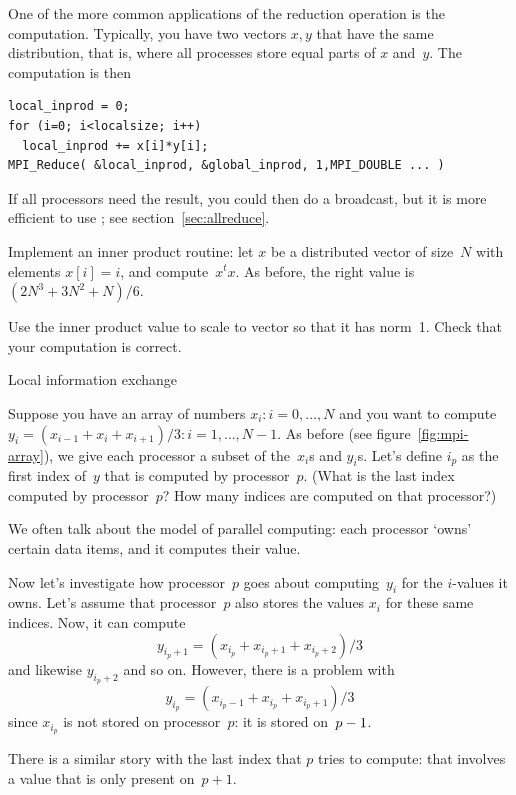 One of the more common applications of the reduction operation
is the  computation. Typically, you have two vectors $x,y$
that have the same distribution, that is,
where all processes store equal parts of $x$ and~$y$.
The computation is then
\begin{verbatim}
local_inprod = 0;
for (i=0; i<localsize; i++)
  local_inprod += x[i]*y[i];
MPI_Reduce( &local_inprod, &global_inprod, 1,MPI_DOUBLE ... ) 
\end{verbatim}
If all processors need the result, you could then do a broadcast,
but it is more efficient to use ; 
see section~\ref{sec:allreduce}.

\begin{exercise}
  \label{ex:inproduct}
  Implement an inner product routine: let $x$ be a
  distributed vector of size~$N$ with elements $x[i]=i$,
  and compute~$x^tx$.
  As before, the right value is $(2N^3+3N^2+N)/6$.

  Use the inner product value to scale to vector so that it has
  norm~1.
  Check that your computation is correct.
\end{exercise}

 {Local information exchange}

Suppose you have an array of numbers $x_i\colon i=0,\ldots,N$
and you want to compute $y_i=(x_{i-1}+x_i+x_{i+1})/3\colon i=1,\ldots,N-1$.
As before (see figure~\ref{fig:mpi-array}), we give each processor
a subset of the~$x_i$s and $y_i$s.
Let's define $i_p$ as the first index of~$y$ that is
computed by processor~$p$. (What is the last index computed by processor~$p$?
How many indices are computed on that processor?)

We often talk about the 
model of parallel computing: each processor `owns' certain data items,
and it computes their value.

Now let's investigate how processor~$p$ goes about computing~$y_i$ for
the $i$-values it owns. Let's assume that processor~$p$ also stores
the values $x_i$ for these same indices.
Now, it can compute
\[ y_{i_p+1} = (x_{i_p}+x_{i_p+1}+x_{i_p+2})/3 \]
and likewise $y_{i_p+2}$ and so on. However, there is a problem with
\[ y_{i_p} = (x_{i_p-1}+x_{i_p}+x_{i_p+1})/3 \]
since $x_{i_p}$ is not stored on processor~$p$: it is stored on~$p-\nobreak1$.

There is a similar story with the last index that $p$ tries to compute:
that involves a value that is only present on~$p+1$.

